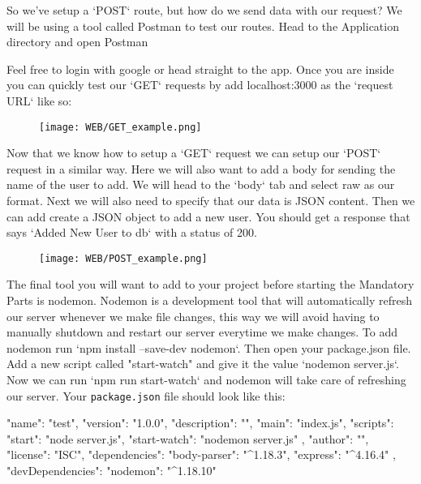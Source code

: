 \documentclass{42-en}
\begin{document}
So we've setup a `POST` route, but how do we send data with our request? We will be using a tool called Postman to test our routes. Head to the Application directory and open Postman

Feel free to login with google or head straight to the app. Once you are inside you can quickly test our `GET` requests by add localhost:3000 as the `request URL` like so:

    \begin{figure}[H]
        \begin{center}
            \texttt{[image: WEB/GET\_example.png]}
        \end{center}
    \end{figure}

Now that we know how to setup a `GET` request we can setup our `POST` request in a similar way. Here we will also want to add a body for sending the name of the user to add. We will head to the `body` tab and select raw as our format. Next we will also need to specify that our data is JSON content. Then we can add create a JSON object to add a new user. You should get a response that says `Added New User to db` with a status of 200.

    \begin{figure}[H]
        \begin{center}
            \texttt{[image: WEB/POST\_example.png]}
        \end{center}
    \end{figure}


The final tool you will want to add to your project before starting the Mandatory Parts is nodemon. Nodemon is a development tool that will automatically refresh our server whenever we make file changes, this way we will avoid having to manually shutdown and restart our server everytime we make changes. To add nodemon run `npm install --save-dev nodemon`. Then open your package.json file. Add a new script called "start-watch" and give it the value `nodemon server.js`. Now we can run `npm run start-watch` and nodemon will take care of refreshing our server. Your \texttt{package.json} file should look like this:
\begin{42jscode}
{
  "name": "test",
  "version": "1.0.0",
  "description": "",
  "main": "index.js",
  "scripts": {
    "start": "node server.js",
	"start-watch": "nodemon server.js"
  },
  "author": "",
  "license": "ISC",
  "dependencies": {
    "body-parser": "^1.18.3",
    "express": "^4.16.4"
  },
  "devDependencies": {
    "nodemon": "^1.18.10"
  }
}
\end{42jscode}
\end{document}
